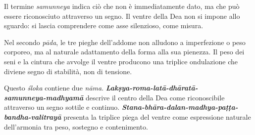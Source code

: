 Il termine \textit{samunneya} indica ciò che non è immediatamente dato, ma che può essere riconosciuto attraverso un segno. Il ventre della Dea non si impone allo sguardo: si lascia comprendere come asse silenzioso, come misura.

Nel secondo \textit{pāda}, le tre pieghe dell’addome non alludono a imperfezione o peso corporeo, ma al naturale adattamento della forma alla sua pienezza. Il peso dei seni e la cintura che avvolge il ventre producono una triplice ondulazione che diviene segno di stabilità, non di tensione.

Questo \textit{śloka} contiene due \textit{nāma}.  
\textbf{\textit{Lakṣya-roma-latā-dhāratā-\\samunneya-madhyamā}} descrive il centro della Dea come riconoscibile attraverso un segno sottile e continuo.  
\textbf{\textit{Stana-bhāra-dalan-madhya-paṭṭa-bandha-valitrayā}} presenta la triplice piega del ventre come espressione naturale dell’armonia tra peso, sostegno e contenimento.
